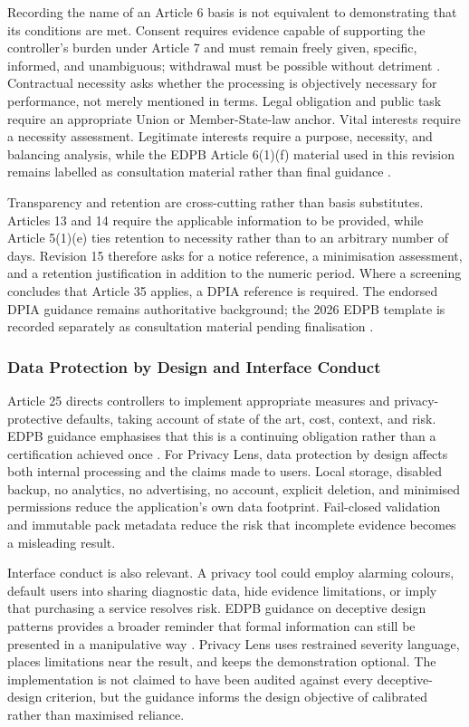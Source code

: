 Recording the name of an Article 6 basis is not equivalent to demonstrating that its conditions are met. Consent requires evidence capable of supporting the controller's burden under Article 7 and must remain freely given, specific, informed, and unambiguous; withdrawal must be possible without detriment \cite{eurlex2016,edpbconsent2020}. Contractual necessity asks whether the processing is objectively necessary for performance, not merely mentioned in terms. Legal obligation and public task require an appropriate Union or Member-State-law anchor. Vital interests require a necessity assessment. Legitimate interests require a purpose, necessity, and balancing analysis, while the EDPB Article 6(1)(f) material used in this revision remains labelled as consultation material rather than final guidance \cite{edpblia2024draft}.

Transparency and retention are cross-cutting rather than basis substitutes. Articles 13 and 14 require the applicable information to be provided, while Article 5(1)(e) ties retention to necessity rather than to an arbitrary number of days. Revision 15 therefore asks for a notice reference, a minimisation assessment, and a retention justification in addition to the numeric period. Where a screening concludes that Article 35 applies, a DPIA reference is required. The endorsed DPIA guidance remains authoritative background; the 2026 EDPB template is recorded separately as consultation material pending finalisation \cite{edpbwp29endorsed,edpbdpia2026consultation}.

\subsubsection{Data Protection by Design and Interface Conduct}

Article 25 directs controllers to implement appropriate measures and privacy-protective defaults, taking account of state of the art, cost, context, and risk. EDPB guidance emphasises that this is a continuing obligation rather than a certification achieved once \cite{edpb2019}. For Privacy Lens, data protection by design affects both internal processing and the claims made to users. Local storage, disabled backup, no analytics, no advertising, no account, explicit deletion, and minimised permissions reduce the application's own data footprint. Fail-closed validation and immutable pack metadata reduce the risk that incomplete evidence becomes a misleading result.

Interface conduct is also relevant. A privacy tool could employ alarming colours, default users into sharing diagnostic data, hide evidence limitations, or imply that purchasing a service resolves risk. EDPB guidance on deceptive design patterns provides a broader reminder that formal information can still be presented in a manipulative way \cite{edpb2022}. Privacy Lens uses restrained severity language, places limitations near the result, and keeps the demonstration optional. The implementation is not claimed to have been audited against every deceptive-design criterion, but the guidance informs the design objective of calibrated rather than maximised reliance.

